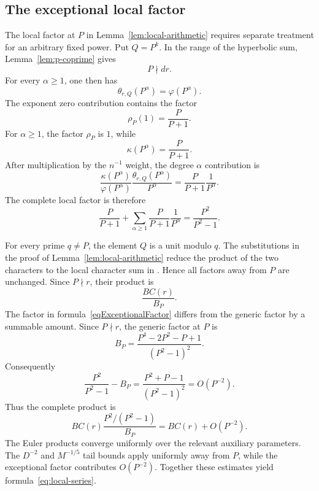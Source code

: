 \documentclass[12pt,reqno]{amsart}
\numberwithin{equation}{section}
\theoremstyle{plain}
\theoremstyle{definition}
\theoremstyle{remark}
\begin{document}
\subsection{The exceptional local factor}

The local factor at $P$ in Lemma~\ref{lem:local-arithmetic} requires separate treatment for an arbitrary fixed power.
Put $Q=P^k$.  In the range of the hyperbolic sum, Lemma~\ref{lem:p-coprime} gives
\begin{equation*}
P\nmid dr.
\end{equation*}
For every $\alpha\geq1$, one then has
\begin{equation*}
\theta_{r,Q}(P^\alpha)=\varphi(P^\alpha).
\end{equation*}
The exponent zero contribution contains the factor
\begin{equation*}
\rho_P(1)=\frac{P}{P+1}.
\end{equation*}
For $\alpha\geq1$, the factor $\rho_P$ is $1$, while
\begin{equation*}
\kappa(P^\alpha)=\frac{P}{P+1}.
\end{equation*}
After multiplication by the $n^{-1}$ weight, the degree
$\alpha$ contribution is
\begin{equation*}
\frac{\kappa(P^\alpha)}{\varphi(P^\alpha)}
\frac{\theta_{r,Q}(P^\alpha)}{P^\alpha}
=
\frac{P}{P+1}\frac{1}{P^\alpha}.
\end{equation*}
The complete local factor is therefore
\begin{equation}
\label{eqExceptionalFactor}
\frac{P}{P+1}
+
\sum_{\alpha\geq1}
\frac{P}{P+1}\frac1{P^\alpha}
=
\frac{P^2}{P^2-1}.
\end{equation}

For every prime $q\neq P$, the element $Q$ is a unit modulo $q$.
The substitutions in the proof of Lemma~\ref{lem:local-arithmetic} reduce the product of the two characters to the local character sum in \cite[Lemmas~3.8--3.10]{Zubrilina2025}.
Hence all factors away from $P$ are unchanged.
Since $P\nmid r$, their product is
\begin{equation*}
\frac{BC(r)}{B_P}.
\end{equation*}
The factor in formula~\eqref{eqExceptionalFactor} differs from the generic factor by a summable amount.
Since $P\nmid r$, the generic factor at $P$ is
\begin{equation*}
B_P=\frac{P^4-2P^2-P+1}{(P^2-1)^2}.
\end{equation*}
Consequently
\begin{equation*}
\frac{P^2}{P^2-1}-B_P
=
\frac{P^2+P-1}{(P^2-1)^2}
=O(P^{-2}).
\end{equation*}
Thus the complete product is
\begin{equation*}
BC(r)\frac{P^2/(P^2-1)}{B_P}=BC(r)+O(P^{-2}).
\end{equation*}
The Euler products converge uniformly over the relevant auxiliary parameters.
The $D^{-2}$ and $M^{-1/5}$ tail bounds apply uniformly away from $P$, while the exceptional factor contributes $O(P^{-2})$.
Together these estimates yield formula~\eqref{eq:local-series}.
\end{document}
